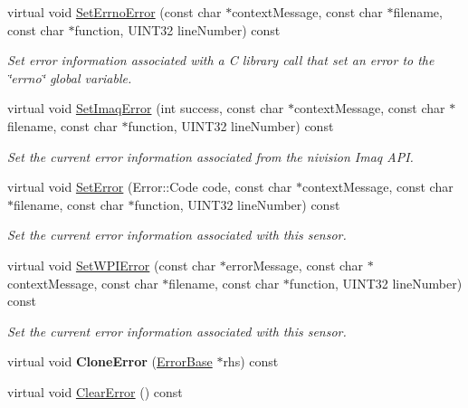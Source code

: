 \begin{DoxyCompactItemize}
\item 
virtual void \hyperlink{classErrorBase_add75f5bb8b6abf2ea78b77d0fd7e573c}{SetErrnoError} (const char $\ast$contextMessage, const char $\ast$filename, const char $\ast$function, UINT32 lineNumber) const 
\begin{DoxyCompactList}\small\item\em Set error information associated with a C library call that set an error to the \char`\"{}errno\char`\"{} global variable. \end{DoxyCompactList}\item 
virtual void \hyperlink{classErrorBase_ab384f36745e20dcc4daeb0f2149ee9bb}{SetImaqError} (int success, const char $\ast$contextMessage, const char $\ast$filename, const char $\ast$function, UINT32 lineNumber) const 
\begin{DoxyCompactList}\small\item\em Set the current error information associated from the nivision Imaq API. \end{DoxyCompactList}\item 
virtual void \hyperlink{classErrorBase_a0b7247c66e6ee1da85be87b07b814273}{SetError} (Error::Code code, const char $\ast$contextMessage, const char $\ast$filename, const char $\ast$function, UINT32 lineNumber) const 
\begin{DoxyCompactList}\small\item\em Set the current error information associated with this sensor. \end{DoxyCompactList}\item 
virtual void \hyperlink{classErrorBase_a647d7afbdbfb9367f01b7e0253f84039}{SetWPIError} (const char $\ast$errorMessage, const char $\ast$contextMessage, const char $\ast$filename, const char $\ast$function, UINT32 lineNumber) const 
\begin{DoxyCompactList}\small\item\em Set the current error information associated with this sensor. \end{DoxyCompactList}\item 
\hypertarget{classErrorBase_adfc72ed28fadc33ffcb73468ea324d14}{
virtual void {\bfseries CloneError} (\hyperlink{classErrorBase}{ErrorBase} $\ast$rhs) const }
\label{classErrorBase_adfc72ed28fadc33ffcb73468ea324d14}

\item 
\hypertarget{classErrorBase_ab67204acd1eb87ffe6fc45c2d22e517e}{
virtual void \hyperlink{classErrorBase_ab67204acd1eb87ffe6fc45c2d22e517e}{ClearError} () const }
\label{classErrorBase_ab67204acd1eb87ffe6fc45c2d22e517e}


\end{DoxyCompactItemize}
